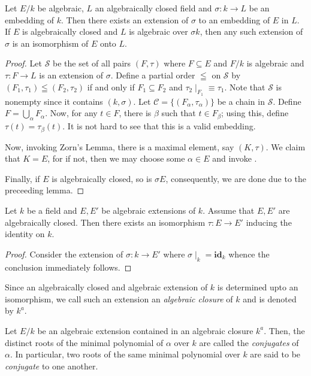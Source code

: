 \begin{theorem}
    Let $E/k$ be algebraic, $L$ an algebraically closed field and $\sigma: k\to L$ be an embedding of $k$. Then there exists an extension of $\sigma$ to an embedding of $E$ in $L$. If $E$ is algebraically closed and $L$ is algebraic over $\sigma k$, then any such extension of $\sigma$ is an isomorphism of $E$ onto $L$.
\end{theorem}
\begin{proof}
    Let $\mathscr S$ be the set of all pairs $(F,\tau)$ where $F\subseteq E$ and $F/k$ is algebraic and $\tau: F\to L$ is an extension of $\sigma$. Define a partial order $\leqq$ on $\mathscr S$ by $(F_1,\tau_1)\leqq(F_2,\tau_2)$ if and only if $F_1\subseteq F_2$ and $\tau_2\mid_{F_1}\equiv\tau_1$. Note that $\mathscr S$ is nonempty since it contains $(k,\sigma)$. Let $\mathscr C = \{(F_\alpha,\tau_\alpha)\}$ be a chain in $\mathscr S$. Define $F = \bigcup_{\alpha} F_\alpha$. Now, for any $t\in F$, there is $\beta$ such that $t\in F_\beta$; using this, define $\tau(t) = \tau_\beta(t)$. It is not hard to see that this is a valid embedding.

    Now, invoking Zorn's Lemma, there is a maximal element, say $(K,\tau)$. We claim that $K = E$, for if not, then we may choose some $\alpha\in E$ and invoke .

    Finally, if $E$ is algebraically closed, so is $\sigma E$, consequently, we are done due to the preceeding lemma.
\end{proof}

\begin{corollary}
    Let $k$ be a field and $E, E'$ be algebraic extensions of $k$. Assume that $E, E'$ are algebraically closed. Then there exists an isomorphism $\tau: E\to E'$ inducing the identity on $k$.
\end{corollary}
\begin{proof}
    Consider the extension of $\sigma: k\to E'$ where $\sigma\mid_k = \mathbf{id}_k$ whence the conclusion immediately follows.
\end{proof}

Since an algebraically closed and algebraic extension of $k$ is determined upto an isomorphism, we call such an extension an \textit{algebraic closure} of $k$ and is denoted by $k^a$.

\begin{definition}[Conjugates]
    Let $E/k$ be an algebraic extension contained in an algebraic closure $k^a$. Then, the distinct roots of the minimal polynomial of $\alpha$ over $k$ are called the \textit{conjugates} of $\alpha$. In particular, two roots of the same minimal polynomial over $k$ are said to be \textit{conjugate} to one another.
\end{definition}